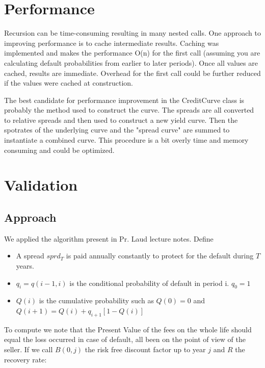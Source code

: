 \section{Performance}

Recursion can be time-consuming resulting in many nested calls.  One
approach to improving performance is to cache intermediate results.
Caching was implemented and makes the performance O(n) for the first
call (assuming you are calculating default probabilities from
earlier to later periods).  Once all values are cached, results are
immediate.  Overhead for the first call could be further reduced if
the values were cached at construction.

The best candidate for performance improvement in the CreditCurve
class is probably the method used to construct the curve.  The
spreads are all converted to relative spreads and then used to
construct a new yield curve. Then the spotrates of the underlying
curve and the "spread curve" are summed to instantiate a combined
curve.  This procedure is a bit overly time and memory consuming and
could be optimized.


\section{Validation}


\subsection{Approach}

We applied the algorithm present in Pr. Laud lecture notes. Define
\begin{itemize}
    \item A spread $sprd_T$ is paid annually constantly to protect for the default during $T$ years.
    \item $q_i =q(i-1,i)$ is the conditional probability of default in period i. $q_0=1$
    \item $Q(i)$ is the cumulative probability such as $Q(0)=0$ and $Q(i+1)=Q(i)+q_{i+1}[1-Q(i)]$
\end{itemize}

To compute we note that the Present Value of the fees on the whole
life should equal the loss occurred in case of default, all been on
the point of view of the seller. If we call $B(0,j)$ the risk free
discount factor up to year $j$ and $R$ the recovery rate:

